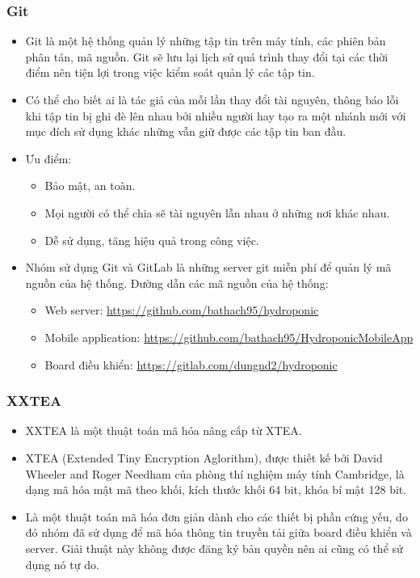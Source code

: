 \documentclass[a4paper,12pt,oneside]{article}
\begin{document}
\subsubsection{Git \cite{git}}
\begin{itemize}
\item Git là một hệ thống quản lý những tập tin trên máy tính, các phiên bản phân tán, mã nguồn. Git sẽ lưu lại lịch sử quá trình thay đổi tại các thời điểm nên tiện lợi trong việc kiểm soát quản lý các tập tin. \item Có thể cho biết ai là tác giả của mỗi lần thay đổi tài nguyên, thông báo lỗi khi tập tin bị ghi đè lên nhau bởi nhiều người hay tạo ra một nhánh mới với mục đích sử dụng khác những vẫn giữ được các tập tin ban đầu.
\item Ưu điểm:
\begin{itemize}
\item Bảo mật, an toàn.
\item Mọi người có thể chia sẽ tài nguyên lẫn nhau ở những nơi khác nhau.
\item Dễ sử dụng, tăng hiệu quả trong công việc.
\end{itemize}
\item Nhóm sử dụng Git và GitLab là những server git miễn phí để quản lý mã nguồn của hệ thống. Đường dẫn các mã nguồn của hệ thống:
\begin{itemize}
\item Web server: \url{https://github.com/bathach95/hydroponic}
\item Mobile application: \url{https://github.com/bathach95/HydroponicMobileApp}
\item Board điều khiển: \url{https://gitlab.com/dungnd2/hydroponic}
\end{itemize}
\end{itemize}

\subsubsection{XXTEA \cite{xxtea}}
\begin{itemize}

\item XXTEA là một thuật toán mã hóa nâng cấp từ XTEA.
\item XTEA (Extended Tiny Encryption Aglorithm), được thiết kế bởi David Wheeler and Roger Needham của phòng thí nghiệm máy tính Cambridge, là dạng mã hóa mật mã theo khối, kích thước khối 64 bit, khóa bí mật 128 bit. \item Là một thuật toán mã hóa đơn giản dành cho các thiết bị phần cứng yếu, do đó nhóm đã sử dụng để mã hóa thông tin truyền tải giữa board điều khiển và server. Giải thuật này không được đăng ký bản quyền nên ai cũng có thể sử dụng nó tự do.
\end{itemize}
\end{document}
